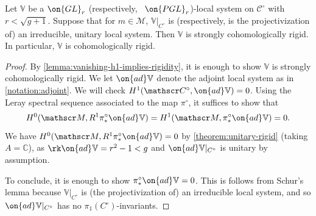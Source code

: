 \begin{proposition}
\notready
	\label{proposition:cohomologically-rigid}
	Let $\mathbb{V}$ be a $\on{GL}_r$ (respectively, ~$\on{PGL}_r$)-local system on
$\mathscr{C}^\circ$ with $r<\sqrt{g+1}$. Suppose that for $m\in \mathscr{M}$,
$\mathbb{V}|_{{C}^\circ}$ is (respectively, is the projectivization
of) an irreducible,
unitary local system. Then $\mathbb{V}$ is strongly cohomologically rigid. In
particular, $\mathbb V$ is cohomologically rigid.
\end{proposition}
\begin{proof}
	By \autoref{lemma:vanishing-h1-implies-rigidity}, it is enough to show
	$\mathbb V$ is strongly cohomologically rigid.
	We let $\on{ad}\mathbb V$ denote the adjoint local system as in
	\autoref{notation:adjoint}.
	We will check
	$H^1(\mathscr C^\circ, \on{ad} \mathbb V) = 0$.
	Using the Leray spectral sequence associated to the map $\pi^\circ$, it suffices to show that
	$$H^0(\mathscr M, R^1 \pi^\circ_* \on{ad} \mathbb V) =
	H^1(\mathscr M, \pi^\circ_* \on{ad} \mathbb V) = 0.$$
	We have
	$H^0(\mathscr M, R^1 \pi^\circ_* \on{ad} \mathbb V) = 0$
	by \autoref{theorem:unitary-rigid} (taking $A=\mathbb{C}$), as $\rk \on{ad}\mathbb{V}=r^2-1<g$ and $\on{ad}\mathbb{V}|_{{C}^\circ}$ is unitary by assumption.

	To conclude, it is enough to show $\pi^\circ_* \on{ad} \mathbb V = 0$.
	This is follows from Schur's lemma because
	$\mathbb{V}|_{{C}^\circ}$ is (the projectivization of) an
	irreducible local system, and so $\on{ad}\mathbb{V}|_{{C}^\circ}$ has no $\pi_1({C}^\circ)$-invariants.
\end{proof}
